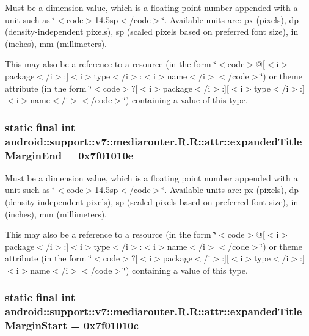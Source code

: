 Must be a dimension value, which is a floating point number appended with a unit such as \char`\"{}$<$code$>$14.5sp$<$/code$>$\char`\"{}. Available units are: px (pixels), dp (density-independent pixels), sp (scaled pixels based on preferred font size), in (inches), mm (millimeters). 

This may also be a reference to a resource (in the form \char`\"{}$<$code$>$@\mbox{[}$<$i$>$package$<$/i$>$:\mbox{]}$<$i$>$type$<$/i$>$:$<$i$>$name$<$/i$>$$<$/code$>$\char`\"{}) or theme attribute (in the form \char`\"{}$<$code$>$?\mbox{[}$<$i$>$package$<$/i$>$:\mbox{]}\mbox{[}$<$i$>$type$<$/i$>$:\mbox{]}$<$i$>$name$<$/i$>$$<$/code$>$\char`\"{}) containing a value of this type. \hypertarget{classandroid_1_1support_1_1v7_1_1mediarouter_1_1_r_1_1attr_e8a045c5de622ba801e212d26bd2f61b}{
\subsubsection[{expandedTitleMarginEnd}]{\setlength{\rightskip}{0pt plus 5cm}static final int android::support::v7::mediarouter.R.R::attr::expandedTitleMarginEnd = 0x7f01010e}}
\label{classandroid_1_1support_1_1v7_1_1mediarouter_1_1_r_1_1attr_e8a045c5de622ba801e212d26bd2f61b}


Must be a dimension value, which is a floating point number appended with a unit such as \char`\"{}$<$code$>$14.5sp$<$/code$>$\char`\"{}. Available units are: px (pixels), dp (density-independent pixels), sp (scaled pixels based on preferred font size), in (inches), mm (millimeters). 

This may also be a reference to a resource (in the form \char`\"{}$<$code$>$@\mbox{[}$<$i$>$package$<$/i$>$:\mbox{]}$<$i$>$type$<$/i$>$:$<$i$>$name$<$/i$>$$<$/code$>$\char`\"{}) or theme attribute (in the form \char`\"{}$<$code$>$?\mbox{[}$<$i$>$package$<$/i$>$:\mbox{]}\mbox{[}$<$i$>$type$<$/i$>$:\mbox{]}$<$i$>$name$<$/i$>$$<$/code$>$\char`\"{}) containing a value of this type. \hypertarget{classandroid_1_1support_1_1v7_1_1mediarouter_1_1_r_1_1attr_b0ff67cc7d8c7bacad0827102a645748}{
\subsubsection[{expandedTitleMarginStart}]{\setlength{\rightskip}{0pt plus 5cm}static final int android::support::v7::mediarouter.R.R::attr::expandedTitleMarginStart = 0x7f01010c}}
\label{classandroid_1_1support_1_1v7_1_1mediarouter_1_1_r_1_1attr_b0ff67cc7d8c7bacad0827102a645748}


